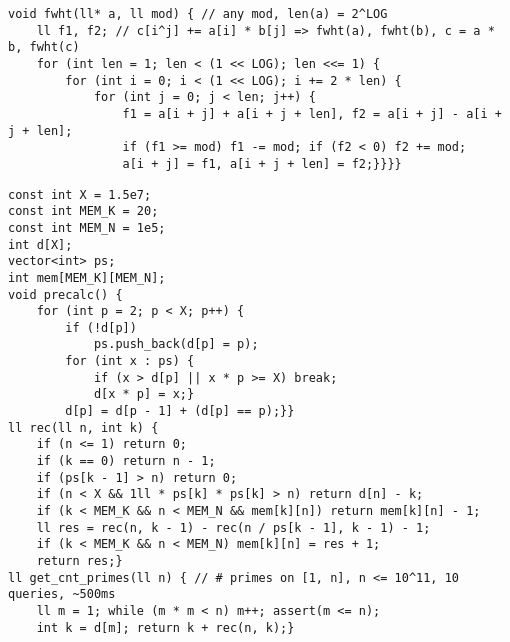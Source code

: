 \documentclass[12pt]{article}
\begin{document}
\begin{verbatim}
void fwht(ll* a, ll mod) { // any mod, len(a) = 2^LOG
    ll f1, f2; // c[i^j] += a[i] * b[j] => fwht(a), fwht(b), c = a * b, fwht(c)
    for (int len = 1; len < (1 << LOG); len <<= 1) {
        for (int i = 0; i < (1 << LOG); i += 2 * len) {
            for (int j = 0; j < len; j++) {
                f1 = a[i + j] + a[i + j + len], f2 = a[i + j] - a[i + j + len];
                if (f1 >= mod) f1 -= mod; if (f2 < 0) f2 += mod;
                a[i + j] = f1, a[i + j + len] = f2;}}}}
\end{verbatim}

\begin{verbatim}
const int X = 1.5e7;
const int MEM_K = 20;
const int MEM_N = 1e5;
int d[X];
vector<int> ps;
int mem[MEM_K][MEM_N];
void precalc() {
    for (int p = 2; p < X; p++) {
        if (!d[p])
            ps.push_back(d[p] = p);
        for (int x : ps) {
            if (x > d[p] || x * p >= X) break;
            d[x * p] = x;}
        d[p] = d[p - 1] + (d[p] == p);}}
ll rec(ll n, int k) {
    if (n <= 1) return 0;
    if (k == 0) return n - 1;
    if (ps[k - 1] > n) return 0;
    if (n < X && 1ll * ps[k] * ps[k] > n) return d[n] - k;
    if (k < MEM_K && n < MEM_N && mem[k][n]) return mem[k][n] - 1;
    ll res = rec(n, k - 1) - rec(n / ps[k - 1], k - 1) - 1;
    if (k < MEM_K && n < MEM_N) mem[k][n] = res + 1;
    return res;}
ll get_cnt_primes(ll n) { // # primes on [1, n], n <= 10^11, 10 queries, ~500ms
    ll m = 1; while (m * m < n) m++; assert(m <= n);
    int k = d[m]; return k + rec(n, k);}
\end{verbatim}



\end{document}
